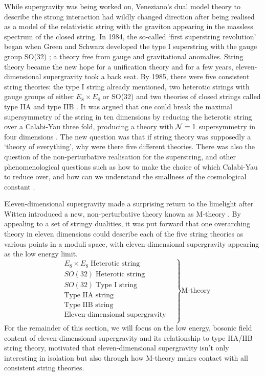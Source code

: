 While supergravity was being worked on, Veneziano's dual model theory to describe the strong interaction \cite{Veneziano:1968yb} had wildly changed direction after being realised as a model of the relativistic string with the graviton appearing in the massless spectrum of the closed string. In 1984, the so-called `first superstring revolution' began when Green and Schwarz developed the type I superstring with the gauge group SO(32) \cite{Green:1984sg}; a theory free from gauge and gravitational anomalies. String theory became the new hope for a unification theory and for a few years, eleven-dimensional supergravity took a back seat. By 1985, there were five consistent string theories: the type I string already mentioned, two heterotic strings with gauge groups of either $E_8 \times E_8$ or SO(32) \cite{Gross:1985fr, Gross:1985rr} and two theories of closed strings called type IIA and type IIB \cite{Green:1981yb}. It was argued that one could break the maximal supersymmetry of the string in ten dimensions by reducing the heterotic string over a Calabi-Yau three fold, producing a theory with ${\cal N} = 1$ supersymmetry in four dimensions \cite{Candelas:1985en}. The new question was that if string theory was supposedly a `theory of everything', why were there five different theories. There was also the question of the non-perturbative realisation for the superstring, and other phenomenological questions such as how to make the choice of which Calabi-Yau to reduce over, and how can we understand the smallness of the cosmological constant \cite{Duff:1999rk}.

Eleven-dimensional supergravity made a surprising return to the limelight after Witten introduced a new, non-perturbative theory known as M-theory \cite{Witten:1995ex}. By appealing to a set of stringy dualities, it was put forward that one overarching theory in eleven dimensions could describe each of the five string theories as various points in a moduli space, with eleven-dimensional supergravity appearing as the low energy limit. 
\begin{equation*}
  \left.\begin{aligned}
  &E_8 \times E_8 \; \text{Heterotic string}\\
  &SO(32) \; \text{Heterotic string} \\
  &SO(32) \; \text{Type I string}\\
  &\text{Type IIA string}\\
  &\text{Type IIB string}\\
  &\text{Eleven-dimensional supergravity} \; \; \;\\
\end{aligned}\right\} \text{M-theory}
\end{equation*}
For the remainder of this section, we will focus on the low energy, bosonic field content of eleven-dimensional supergravity and its relationship to type IIA/IIB string theory, motivated that eleven-dimensional supergravity isn't only interesting in isolation but also through how M-theory makes contact with all consistent string theories. 

